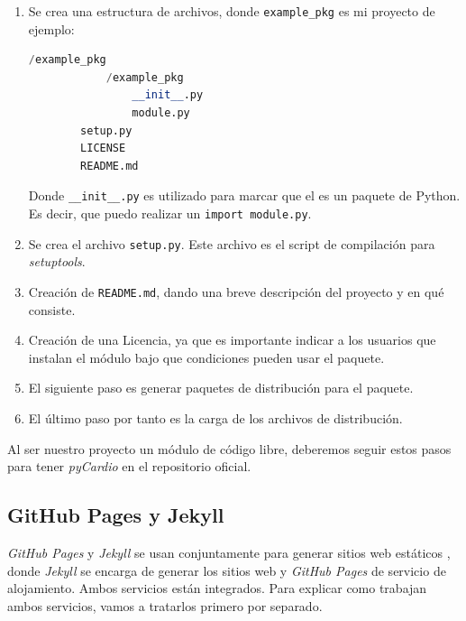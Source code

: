\documentclass[a4paper, 12pt]{book}
\begin{document}
\begin{enumerate}
    \item Se crea una estructura de archivos, donde \texttt{example_pkg} es mi proyecto de ejemplo: 
    \begin{lstlisting}[language=python]
        /example_pkg
            /example_pkg
                __init__.py
                module.py
        setup.py
        LICENSE
        README.md
    \end{lstlisting}
    Donde \texttt{\_\_init\_\_.py} es utilizado para marcar que el  es un paquete de Python. Es decir, que puedo realizar un \texttt{import module.py}. 
    \item Se crea el archivo \texttt{setup.py}. Este archivo es el script de compilación para \emph{setuptools}. 
    \item Creación de \texttt{README.md}, dando una breve descripción del proyecto y en qué consiste. 
    \item Creación de una Licencia, ya que es importante indicar a los usuarios que instalan el módulo bajo que condiciones pueden usar el paquete. 
    \item El siguiente paso es generar paquetes de distribución para el paquete. 
    \item El último paso por tanto es la carga de los archivos de distribución.
\end{enumerate}
Al ser nuestro proyecto un módulo de código libre, deberemos seguir estos pasos para tener \emph{pyCardio} en el repositorio oficial. 

    
\subsection{GitHub Pages y Jekyll}
\label{subsec:githubJekyll}
\emph{GitHub Pages} y \emph{Jekyll} se usan conjuntamente para generar sitios web estáticos , donde \emph{Jekyll} se encarga de generar los sitios web y \emph{GitHub Pages} de servicio de alojamiento. Ambos servicios están integrados. Para explicar como trabajan ambos servicios, vamos a tratarlos primero por separado.
\end{document}
